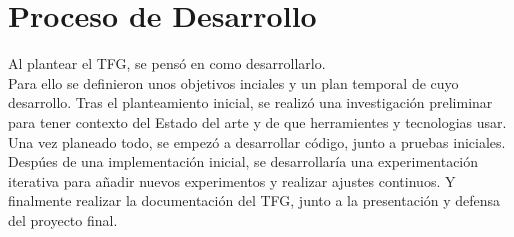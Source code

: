 \section{Proceso de Desarrollo}\label{sec:proceso_de_desarrollo}
Al plantear el TFG, se pensó en como desarrollarlo. \\[6pt]

Para ello se definieron unos objetivos inciales y un plan temporal de cuyo desarrollo.
Tras el planteamiento inicial, se realizó una investigación preliminar para tener contexto del Estado del arte y de
que herramientes y tecnologias usar. \\[6pt]

Una vez planeado todo, se empezó a desarrollar código, junto a pruebas iniciales.
Despúes de una implementación inicial, se desarrollaría una experimentación iterativa para añadir nuevos experimentos y
realizar ajustes continuos.
Y finalmente realizar la documentación del TFG, junto a la presentación y defensa del proyecto final.




